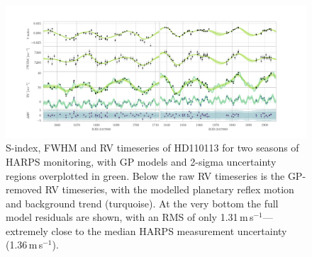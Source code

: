 \documentclass[fleqn,usenatbib]{mnras}
\newcommand{\ms}{m\,s$^{-1}$}
\begin{document}

\begin{figure}
	\includegraphics[width=\textwidth, trim={0.85cm 0.8 1.9cm 0.4cm}]{Combined_RV_plots_3_GPs_final.pdf}
    \caption{S-index, FWHM and RV timeseries of HD110113 for two seasons of HARPS monitoring, with GP models and 2-sigma uncertainty regions overplotted in green. Below the raw RV timeseries is the GP-removed RV timeseries, with the modelled planetary reflex motion and background trend (turquoise). At the very bottom the full model residuals are shown, with an RMS of only 1.31\,\ms{}---extremely close to the median HARPS measurement uncertainty (1.36\,\ms{}).}
    \label{fig:RVs}
\end{figure}
\end{document}
